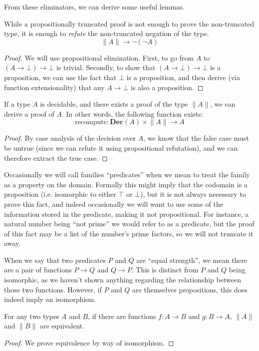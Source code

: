 \begin{subappendices}
From these eliminators, we can derive some useful lemmas.
\begin{lemma}
  While a propositionally truncated proof is not enough to prove the
  non-truncated type, it is enough to \emph{refute} the non-truncated negation
  of the type.
  \begin{equation}
    \lVert A \rVert \rightarrow \neg (\neg A)
  \end{equation}
\end{lemma}
\begin{proof}
  We will use propositional elimination.
  First, to go from \(A\) to \((A \rightarrow \bot) \rightarrow \bot\) is
  trivial.
  Secondly, to show that \((A \rightarrow \bot) \rightarrow \bot\) is a
  proposition, we can use the fact that \(\bot\) is a proposition, and then
  derive (via function extensionality) that any \(A \rightarrow \bot\) is also a
  proposition.
\end{proof}

\begin{lemma}[Recomputation]
  If a type \(A\) is decidable, and there exists a proof of the type \(\lVert A
  \rVert\), we can derive a proof of \(A\).
  In other words, the following function exists:
  \begin{equation}
    \text{recompute} : \textbf{Dec}(A) \times \lVert A \rVert \rightarrow A
  \end{equation}
\end{lemma}
\begin{proof}
  By case analysis of the decision over \(A\), we know that the false case must
  be untrue (since we can refute it using propositional refutation), and we can
  therefore extract the true case.
\end{proof}

Occasionally we will call families ``predicates'' when we mean to treat the
family as a property on the domain.
Formally this might imply that the codomain is a proposition (i.e. isomorphic to
either \(\top\) or \(\bot\)), but it is not always necessary to prove this fact,
and indeed occasionally we will want to use some of the information stored in
the predicate, making it not propositional.
For instance, a natural number being ``not prime'' we would refer to as a
predicate, but the proof of this fact may be a list of the number's prime
factors, so we will not truncate it away.

When we say that two predicates \(P\) and \(Q\) are ``equal strength'', we mean
there are a pair of functions \(P \rightarrow Q\) and \(Q \rightarrow P\).
This is distinct from \(P\) and \(Q\) being isomorphic, as we haven't shown
anything regarding the relationship between those two functions.
However, if \(P\) and \(Q\) are themselves propositions, this does indeed imply
an isomorphism.
\begin{lemma} \label{equal-strength}
  For any two types \(A\) and \(B\), if there are functions \(f : A \rightarrow
  B\) and \(g : B \rightarrow A\), \(\lVert A \rVert\) and \(\lVert B \rVert\)
  are equivalent.
\end{lemma}
\begin{proof}
  We prove equivalence by way of isomorphism.


\end{proof}
\end{subappendices}
